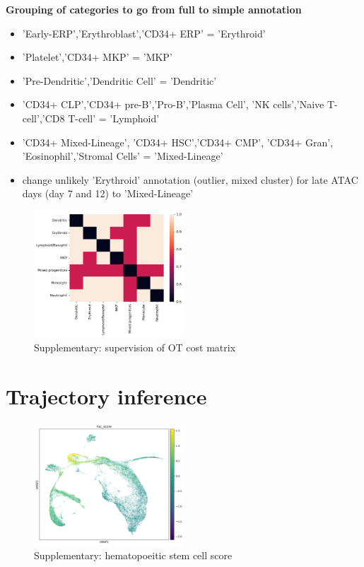 \documentclass[a4paper]{article}
\begin{document}
\textbf{Grouping of categories to go from full to simple annotation}
\begin{itemize}
  \item 'Early-ERP','Erythroblast','CD34+ ERP' = 'Erythroid'
  \item 'Platelet','CD34+ MKP' = 'MKP'
  \item 'Pre-Dendritic','Dendritic Cell' = 'Dendritic'
  \item 'CD34+ CLP','CD34+ pre-B','Pro-B','Plasma Cell', 'NK cells','Naive T-cell','CD8 T-cell' = 'Lymphoid'
  \item 'CD34+ Mixed-Lineage', 'CD34+ HSC','CD34+ CMP', 'CD34+ Gran', 'Eosinophil','Stromal Cells' = 'Mixed-Lineage'
  \item change unlikely 'Erythroid' annotation (outlier, mixed cluster) for late ATAC days (day 7 and 12) to 'Mixed-Lineage'
\end{itemize}

\begin{figure}[!htb]
  \centering
  \includegraphics[width=0.5\textwidth]{../figures/hematopoiesis/integration_supervision.png}
  \caption{Supplementary: supervision of OT cost matrix}
\end{figure}

\FloatBarrier
\section{Trajectory inference}

\begin{figure}[!htb]
  \centering
  \includegraphics[width=0.5\textwidth]{../figures/hematopoiesis/integrated_hsc_score.png}
  \caption{Supplementary: hematopoeitic stem cell score}
\end{figure}
\end{document}
